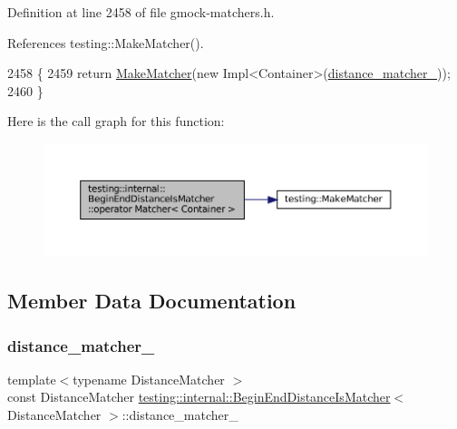 Definition at line 2458 of file gmock-\/matchers.\+h.



References testing\+::\+Make\+Matcher().


\begin{DoxyCode}
2458                                       \{
2459     \textcolor{keywordflow}{return} \hyperlink{namespacetesting_a37fd8029ac00e60952440a3d9cca8166}{MakeMatcher}(\textcolor{keyword}{new} Impl<Container>(\hyperlink{classtesting_1_1internal_1_1BeginEndDistanceIsMatcher_af70136950ed3d02c77f809e2b659d9a9}{distance\_matcher\_}));
2460   \}
\end{DoxyCode}
Here is the call graph for this function\+:
\nopagebreak
\begin{figure}[H]
\begin{center}
\leavevmode
\includegraphics[width=350pt]{classtesting_1_1internal_1_1BeginEndDistanceIsMatcher_af4d79ed63bce73e5cecd6f542aeb57ce_cgraph}
\end{center}
\end{figure}


\subsection{Member Data Documentation}
\mbox{\label{classtesting_1_1internal_1_1BeginEndDistanceIsMatcher_af70136950ed3d02c77f809e2b659d9a9}} 
\subsubsection{\texorpdfstring{distance\+\_\+matcher\+\_\+}{distance\_matcher\_}}
{\footnotesize\ttfamily template$<$typename Distance\+Matcher $>$ \\
const Distance\+Matcher \hyperlink{classtesting_1_1internal_1_1BeginEndDistanceIsMatcher}{testing\+::internal\+::\+Begin\+End\+Distance\+Is\+Matcher}$<$ Distance\+Matcher $>$\+::distance\+\_\+matcher\+\_\+\hspace{0.3cm}{\ttfamily [private]}}




